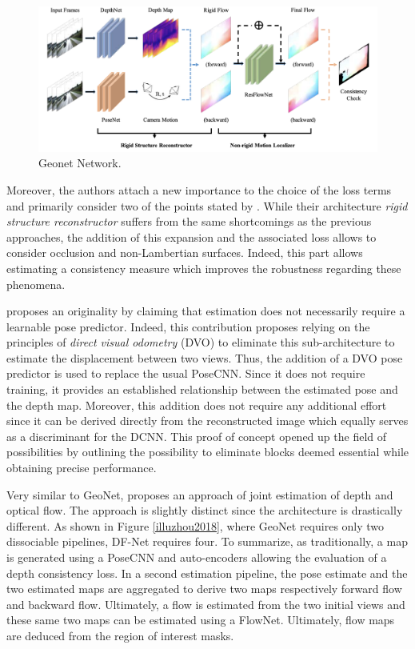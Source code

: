\begin{figure}[h]
	\centering
	\includegraphics[width=0.8\linewidth]{Figures/SOA/geonet}
	\caption[Geonet Network.]{Geonet \cite{yin2018geonet} Network.}
	\label{geonet}
\end{figure}


Moreover, the authors attach a new importance to the choice of the loss terms and primarily consider two of the points stated by \cite{zhou2017unsupervised}. 
While their architecture \emph{rigid structure reconstructor} suffers from the same shortcomings as the previous approaches, the addition of this expansion and the associated loss allows to consider occlusion and non-Lambertian surfaces. Indeed, this part allows estimating a consistency measure which improves the robustness regarding these phenomena.


\cite{wang2018learning} proposes an originality by claiming that estimation does not necessarily require a learnable pose predictor. Indeed, this contribution proposes relying on the principles of \emph{direct visual odometry} (DVO) to eliminate this sub-architecture to estimate the displacement between two views.
Thus, the addition of a DVO \cite{steinbrucker2011real} pose predictor is used to replace the usual PoseCNN. Since it does not require training, it provides an established relationship between the estimated pose and the depth map. Moreover, this addition does not require any additional effort since it can be derived directly from the reconstructed image which equally serves as a discriminant for the DCNN. This proof of concept opened up the field of possibilities by outlining the possibility to eliminate blocks deemed essential while obtaining precise performance. 


Very similar to GeoNet\cite{yin2018geonet}, \cite{zou2018df} proposes an approach of joint estimation of depth and optical flow. The approach is slightly distinct since the architecture is drastically different. As shown in Figure \ref{illuzhou2018}, where GeoNet requires only two dissociable pipelines, DF-Net requires four. To summarize, as traditionally, a map is generated using a PoseCNN and auto-encoders allowing the evaluation of a depth consistency loss. In a second estimation pipeline, the pose estimate and the two estimated maps are aggregated to derive two maps respectively forward flow and backward flow. Ultimately, a flow is estimated from the two initial views and these same two maps can be estimated using a FlowNet. Ultimately, flow maps are deduced from the region of interest masks.

